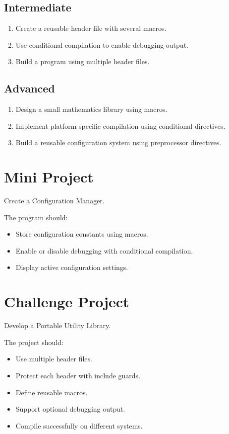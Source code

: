 \documentclass[12pt,openany]{book}
\begin{document}
\subsection*{Intermediate}

\begin{enumerate}
    \item Create a reusable header file with several macros.
    \item Use conditional compilation to enable debugging output.
    \item Build a program using multiple header files.
\end{enumerate}

\subsection*{Advanced}

\begin{enumerate}
    \item Design a small mathematics library using macros.
    \item Implement platform-specific compilation using conditional directives.
    \item Build a reusable configuration system using preprocessor directives.
\end{enumerate}

\section{Mini Project}

Create a Configuration Manager.

The program should:

\begin{itemize}
    \item Store configuration constants using macros.
    \item Enable or disable debugging with conditional compilation.
    \item Display active configuration settings.
\end{itemize}

\section{Challenge Project}

Develop a Portable Utility Library.

The project should:

\begin{itemize}
    \item Use multiple header files.
    \item Protect each header with include guards.
    \item Define reusable macros.
    \item Support optional debugging output.
    \item Compile successfully on different systems.
\end{itemize}
\end{document}
